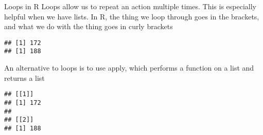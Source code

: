 \documentclass[
  10pt,
  ignorenonframetext,
  aspectratio=169]{beamer}
\newenvironment{Shaded}{\begin{snugshade}}{\end{snugshade}}
\newcommand{\ControlFlowTok}[1]{\textcolor[rgb]{0.94,0.87,0.69}{#1}}
\newcommand{\FunctionTok}[1]{\textcolor[rgb]{0.94,0.94,0.56}{#1}}
\newcommand{\NormalTok}[1]{\textcolor[rgb]{0.80,0.80,0.80}{#1}}
\newcommand{\OtherTok}[1]{\textcolor[rgb]{0.94,0.94,0.56}{#1}}
\newcommand{\SpecialCharTok}[1]{\textcolor[rgb]{0.86,0.64,0.64}{#1}}
\begin{document}
\begin{frame}[fragile]{Loops in R}
\protect\hypertarget{loops-in-r}{}
Loops allow us to repeat an action multiple times. This is especially
helpful when we have lists. In R, the thing we loop through goes in the
brackets, and what we do with the thing goes in curly brackets

\scriptsize

\begin{Shaded}
\end{Shaded}

\begin{verbatim}
## [1] 172
## [1] 188
\end{verbatim}

\normalsize

An alternative to loops is to use apply, which performs a function on a
list and returns a list

\scriptsize

\begin{Shaded}
\end{Shaded}

\begin{verbatim}
## [[1]]
## [1] 172
## 
## [[2]]
## [1] 188
\end{verbatim}
\end{frame}
\end{document}
